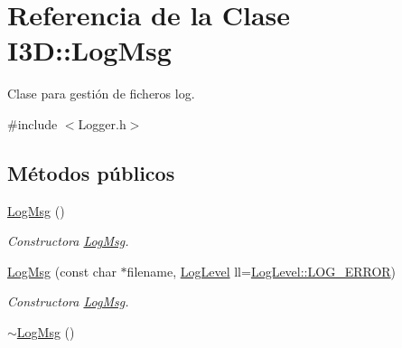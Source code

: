 \hypertarget{class_i3_d_1_1_log_msg}{}\section{Referencia de la Clase I3D\+:\+:Log\+Msg}
\label{class_i3_d_1_1_log_msg}


Clase para gestión de ficheros log.  




{\ttfamily \#include $<$Logger.\+h$>$}

\subsection*{Métodos públicos}
\begin{DoxyCompactItemize}
\item 
\hyperlink{class_i3_d_1_1_log_msg_a5cb7a7b1765778874c2b87d2245463c6}{Log\+Msg} ()
\begin{DoxyCompactList}\small\item\em Constructora \hyperlink{class_i3_d_1_1_log_msg}{Log\+Msg}. \end{DoxyCompactList}\item 
\hyperlink{class_i3_d_1_1_log_msg_ac6d1edcbbc1806f42114374f23cacb8d}{Log\+Msg} (const char $\ast$filename, \hyperlink{namespace_i3_d_ae1af0f2e3b629610c45222809ff521f6}{Log\+Level} ll=\hyperlink{namespace_i3_d_ae1af0f2e3b629610c45222809ff521f6a4490aa3d29644e716440fada68f54032}{Log\+Level\+::\+L\+O\+G\+\_\+\+E\+R\+R\+OR})
\begin{DoxyCompactList}\small\item\em Constructora \hyperlink{class_i3_d_1_1_log_msg}{Log\+Msg}. \end{DoxyCompactList}\item 
\hyperlink{class_i3_d_1_1_log_msg_aa0811c5bd5866194a285bd8d066a4f4c}{$\sim$\+Log\+Msg} ()
\end{DoxyCompactItemize}
